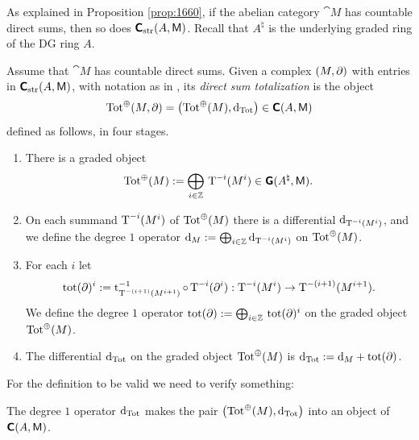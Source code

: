 As explained in Proposition \ref{prop:1660},
if the abelian category $\cat{M}$ has 
countable direct sums, then so does $\boldsymbol{\mathsf{C}}_{\mathrm{str}}(A, \operatorname{\mathsf{M}})$. 
Recall that $A^{\natural}$ is the underlying graded ring of the DG ring $A$. 

\begin{dfn} \label{dfn:3300}
Assume that $\cat{M}$ has countable direct sums. Given a complex 
$(M, \partial)$ with entries in $\boldsymbol{\mathsf{C}}_{\mathrm{str}}(A, \operatorname{\mathsf{M}})$, with notation as 
in \tup{(\ref{eqn:3300})}, its {\em direct sum totalization}%
is the object 
\[ \operatorname{Tot}^{\oplus}(M, \partial)  = 
\bigl( \operatorname{Tot}^{\oplus}(M), \mathrm{d}_{\mathrm{Tot}} \bigr) \in  
\boldsymbol{\mathsf{C}}(A, \operatorname{\mathsf{M}}) \]
defined as follows, in four stages. 
\begin{enumerate}
\item There is a graded object 
\[ \operatorname{Tot}^{\oplus}(M) := \bigoplus_{i \in \mathbb{Z}} \, 
\operatorname{T}^{-i}(M^i) \in \boldsymbol{\mathsf{G}}(A^{\natural}, \operatorname{\mathsf{M}}) . \]

\item On each summand $\operatorname{T}^{-i}(M^i)$ of $\operatorname{Tot}^{\oplus}(M)$
there is a differential 
$\mathrm{d}_{\operatorname{T}^{-i}(M^i)}$, 
and we define the degree $1$ operator 
$\mathrm{d}_M := \bigoplus_{i \in \mathbb{Z}} \mathrm{d}_{\operatorname{T}^{-i}(M^i)}$ 
on $\operatorname{Tot}^{\oplus}(M)$.

\item For each $i$ let 
\[ \operatorname{tot}(\partial)^i := \operatorname{t}^{-1}_{ \operatorname{T}^{-(i + 1)}(M^{i + 1})} \circ 
\operatorname{T}^{-i}(\partial^i) : 
\operatorname{T}^{-i}(M^i) \to \operatorname{T}^{-(i + 1)}(M^{i + 1}) . \]
We define the degree $1$ operator 
$\operatorname{tot}(\partial) :=  \bigoplus_{i \in \mathbb{Z}} \, \operatorname{tot}(\partial)^i$
on the graded object $\operatorname{Tot}^{\oplus}(M)$.

\item The differential $\mathrm{d}_{\mathrm{Tot}}$ on the graded object 
$\operatorname{Tot}^{\oplus}(M)$ is 
$\mathrm{d}_{\mathrm{Tot}} := \mathrm{d}_M + \operatorname{tot}(\partial)$.
\end{enumerate}
\end{dfn}

For the definition to be valid we need to verify something: 

\begin{lem} \label{lem:3030}
The degree $1$ operator $\mathrm{d}_{\mathrm{Tot}}$ makes the pair 
$\bigl( \operatorname{Tot}^{\oplus}(M), \mathrm{d}_{\mathrm{Tot}} \bigr)$
into an object of $\boldsymbol{\mathsf{C}}(A, \operatorname{\mathsf{M}})$. 
\end{lem}

